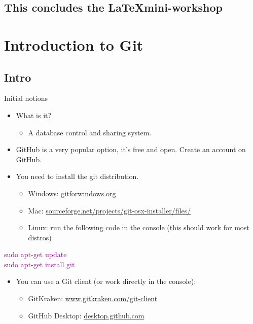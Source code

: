 \documentclass[usenames,dvipsnames,aspectratio=169]{beamer}
\newcommand{\aitem}{\item[$\cdot$]}
\newcommand{\bitem}{\item[-]}
\begin{document}
\subsection{This concludes the \LaTeX mini-workshop}

\section{Introduction to Git}
\subsection{Intro}
\begin{frame}[t]{Initial notions}
\begin{itemize}
\aitem What is it?
\begin{itemize}
\bitem A database control and sharing system.
\end{itemize}
\aitem GitHub is a very popular option, it's free and open. Create an account on GitHub.
\aitem You need to install the git distribution.
\begin{itemize}
\bitem Windows: \textcolor{blue}{\url{gitforwindows.org}}
\bitem Mac: \textcolor{blue}{\url{sourceforge.net/projects/git-osx-installer/files/}}
\bitem Linux: run the following code in the console (this should work for most distros)
\end{itemize}
\end{itemize}
\textcolor{purple}{
sudo apt-get update\\
sudo apt-get install git}
\begin{itemize}
\aitem You can use a Git client (or work directly in the console):
\begin{itemize}
\bitem GitKraken: \textcolor{blue}{\url{www.gitkraken.com/git-client}}
\bitem GitHub Desktop: \textcolor{blue}{\url{desktop.github.com}}
\end{itemize}
\end{itemize}
\end{frame}

\end{document}
